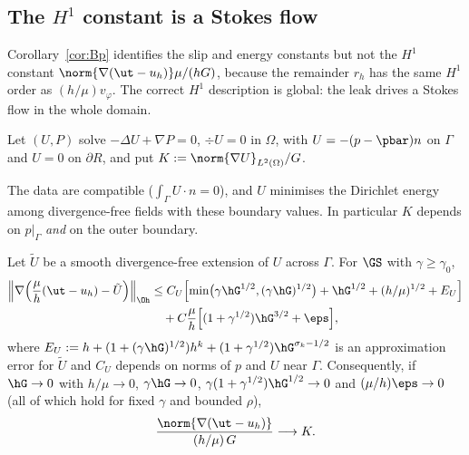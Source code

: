 \subsection{The \texorpdfstring{$H^1$}{H1} constant is a Stokes flow}\label{sec:leakflow}
Corollary~\ref{cor:Bp} identifies the slip and energy constants but not the $H^1$ constant $\norm{\nabla(\ut-u_h)}\mu/(hG)$, because the remainder $r_h$ has the same $H^1$ order as $(h/\mu)v_\varphi$. The correct $H^1$ description is global: the leak drives a Stokes flow in the whole domain.

\begin{definition}\label{def:leak}
Let $(U,P)$ solve $-\Delta U+\nabla P=0$, $\div U=0$ in $\Omega$, with $U=-(p-\pbar)n$ on $\Gamma$ and $U=0$ on $\partial R$, and put $K:=\norm{\nabla U}_{L^2(\Omega)}/G$.
\end{definition}

The data are compatible ($\int_\Gamma U\cdot n=0$), and $U$ minimises the Dirichlet energy among divergence-free fields with these boundary values. In particular $K$ depends on $p|_\Gamma$ \emph{and} on the outer boundary.

\begin{theorem}\label{thm:hc}
Let $\tilde U$ be a smooth divergence-free extension of $U$ across $\Gamma$. For $\GS$ with $\gamma\ge\gamma_0$,
\[
\begin{aligned}
\Bigl\|\nabla\Bigl(\frac\mu h(\ut-u_h)-\tilde U\Bigr)\Bigr\|_{\Oh}&\le C_U\Bigl[\min\bigl(\gamma\hG^{1/2},(\gamma\hG)^{1/2}\bigr)+\hG^{1/2}+(h/\mu)^{1/2}+E_U\Bigr]\\
&\quad+C\frac\mu h\Bigl[(1+\gamma^{1/2})\hG^{3/2}+\eps\Bigr],
\end{aligned}
\]
where $E_U:=h+(1+(\gamma\hG)^{1/2})h^k+(1+\gamma^{1/2})\hG^{\sigma_k-1/2}$ is an approximation error for $\tilde U$ and $C_U$ depends on norms of $p$ and $U$ near $\Gamma$.
Consequently, if $\hG\to0$ with $h/\mu\to0$, $\gamma\hG\to0$, $\gamma(1+\gamma^{1/2})\hG^{1/2}\to0$ and $(\mu/h)\eps\to0$ (all of which hold for fixed $\gamma$ and bounded $\rho$),
\[
\frac{\norm{\nabla(\ut-u_h)}}{(h/\mu)\,G}\longrightarrow K .
\]
\end{theorem}

